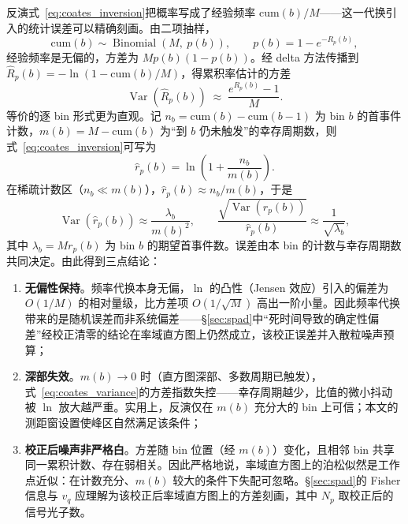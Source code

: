 \documentclass[11pt,a4paper]{ctexart}
\numberwithin{equation}{section}
\newcommand{\Var}{\operatorname{Var}}
\begin{document}
反演式~\eqref{eq:coates_inversion}把概率写成了经验频率 $\mathrm{cum}(b)/M$——这一代换引入的统计误差可以精确刻画。由二项抽样，
\begin{equation}
    \mathrm{cum}(b)
    \sim
    \operatorname{Binomial}\!\left(M,\ p(b)\right),
    \qquad
    p(b) = 1-e^{-R_p(b)},
    \label{eq:binomial_sampling}
\end{equation}
经验频率是无偏的，方差为 $Mp(b)(1-p(b))$。经 delta 方法传播到
$\hat R_p(b) = -\ln\!\left(1-\mathrm{cum}(b)/M\right)$，得累积率估计的方差
\begin{equation}
    \boxed{
    \Var\!\left(\hat R_p(b)\right)
    \;\approx\;
    \frac{e^{R_p(b)}-1}{M}
    }.
    \label{eq:coates_variance}
\end{equation}
等价的逐 bin 形式更为直观。记 $n_b = \mathrm{cum}(b)-\mathrm{cum}(b-1)$ 为 bin $b$ 的首事件计数，$m(b) = M-\mathrm{cum}(b)$ 为``到 $b$ 仍未触发''的幸存周期数，则式~\eqref{eq:coates_inversion}可写为
\begin{equation}
    \hat r_p(b) = \ln\!\left(1+\frac{n_b}{m(b)}\right).
    \label{eq:per_bin_form}
\end{equation}
在稀疏计数区（$n_b \ll m(b)$），$\hat r_p(b)\approx n_b/m(b)$，于是
\begin{equation}
    \Var\!\left(\hat r_p(b)\right)
    \approx
    \frac{\lambda_b}{m(b)^2},
    \qquad
    \frac{\sqrt{\Var(\hat r_p(b))}}{\hat r_p(b)}
    \approx
    \frac{1}{\sqrt{\lambda_b}},
    \label{eq:sparse_regime}
\end{equation}
其中 $\lambda_b = Mr_p(b)$ 为 bin $b$ 的期望首事件数。误差由本 bin 的计数与幸存周期数共同决定。由此得到三点结论：

\begin{enumerate}
    \item \textbf{无偏性保持}。频率代换本身无偏，$\ln$ 的凸性（Jensen 效应）引入的偏差为 $O(1/M)$ 的相对量级，比方差项 $O(1/\sqrt{M})$ 高出一阶小量。因此频率代换带来的是随机误差而非系统偏差——\S\ref{sec:spad}中``死时间导致的确定性偏差''经校正清零的结论在率域直方图上仍然成立，该校正误差并入散粒噪声预算；
    \item \textbf{深部失效}。$m(b)\to 0$ 时（直方图深部、多数周期已触发），式~\eqref{eq:coates_variance}的方差指数失控——幸存周期越少，比值的微小抖动被 $\ln$ 放大越严重。实用上，反演仅在 $m(b)$ 充分大的 bin 上可信；本文的测距窗设置使峰区自然满足该条件；
    \item \textbf{校正后噪声非严格白}。方差随 bin 位置（经 $m(b)$）变化，且相邻 bin 共享同一累积计数、存在弱相关。因此严格地说，率域直方图上的泊松似然是工作点近似：在计数充分、$m(b)$ 较大的条件下失配可忽略。\S\ref{sec:spad}的 Fisher 信息与 $v_q$ 应理解为该校正后率域直方图上的方差刻画，其中 $N_p$ 取校正后的信号光子数。
\end{enumerate}
\end{document}
